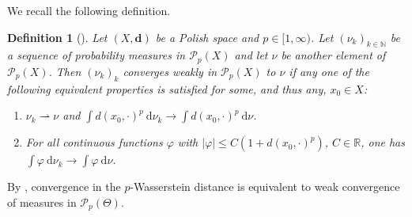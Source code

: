 \documentclass[a4paper]{scrartcl}
\newtheorem{definition}[theorem]{Definition}
\theoremstyle{definition}
\numberwithin{equation}{section}
\newcommand{\R}{\mathbb{R}}
\newcommand{\N}{\mathbb{N}}
\newcommand{\rd}{\mathrm{d}}
\newcommand{\abs}[1]{\vert #1\vert}
\begin{document}
We recall the following definition.
\begin{definition}[{\cite[Definition 6.8]{Villani2009}}]
 \label{def_weak_convergence_in_Wasserstein_space}
 Let $(X,\mathbf{d})$ be a Polish space and $p\in [1,\infty)$. Let $(\nu_k)_{k\in\N}$ be a sequence of probability measures in $\mathcal{P}_p(X)$ and let $\nu$ be another element of $\mathcal{P}_p(X)$. Then $(\nu_k)_k$ converges weakly in $\mathcal{P}_p(X)$ to $\nu$ if any one of the following equivalent properties is satisfied for some, and thus any, $x_0\in X$:
 \begin{enumerate}
  \item \label{item_weak_convergence_in_Wasserstein_space_1}
  $\nu_k\rightharpoonup\nu$ and $\int d(x_0,\cdot)^p~\rd\nu_k\to \int d(x_0,\cdot)^p~\rd\nu$.
  \item \label{item_weak_convergence_in_Wasserstein_space_2}
  For all continuous functions $\varphi$ with $\abs{\varphi}\leq C(1+d(x_0,\cdot)^p)$, $C\in\R$, one has $\int \varphi~\rd \nu_k\to\int\varphi~\rd\nu$.
 \end{enumerate}
\end{definition}
By \cite[Theorem 6.9]{Villani2009}, convergence in the $p$-Wasserstein distance is equivalent to weak convergence of measures in $\mathcal{P}_p(\Theta)$.
\end{document}
